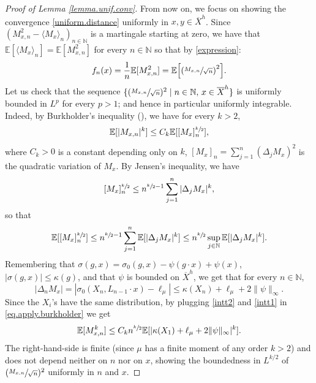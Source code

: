\documentclass[JEP,XML,SOM,Unicode,published]{cedram}
\let\sep\mid
\theoremstyle{plain}
\theoremstyle{definition}
\newcommand\E{\mathbb{E}}
\newcommand\N{\mathbb{N}}
\begin{document}
\begin{proof}[Proof of Lemma \ref{lemma.unif.conv}]
From now on, we focus on showing the convergence \eqref{uniform.distance} uniformly in $x,y\in \overline{X}^h$. Since $(M_{x,n}^2-\langle M_x\rangle_n)_{n\in \N}$ is a martingale starting at zero, we have that $\E[\langle M_x\rangle_n]=\E[M_{x,n}^2]$ for every $n\in \N$ so that by \eqref{expression}:
\begin{equation}\label{identity1}
f_n(x)=\frac{1}{n}\E[M_{x,n}^2]=\E\Bigl[\left(\sfrac{M_{x,n}}{\sqrt{n}}\right)^2\Bigr].
\end{equation}
Let us check that the sequence $\{(\sfrac{M_{x,n}}{\sqrt{n}})^2 \sep n\in \N,\, x\in \overline{X}^h\}$ is uniformly bounded in $L^p$ for every $p> 1$; and hence in particular uniformly integrable. Indeed,
by Burkholder's inequality (\cite[Th.\,9]{burkholder}), we have
for every $k>2$,
\begin{equation}\label{eq.apply.burkholder}
\E[|M_{x,n}|^k]\leq C_k \E[[M_x]_n^{\sfrac{k}{2}}],
\end{equation}
where $C_k>0$ is a constant depending only on $k$, $[M_x]_n=\sum_{j=1}^n{(\Delta_j M_{x})^2}$ is the quadratic variation of $M_x$.
By Jensen's inequality, we have
\[
[M_x]_n^{\sfrac{k}{2}}\leq n^{\sfrac{k}{2}-1}\sum_{j=1}^n{|\Delta_j M_{x}|^k},
\]
so that
\begin{equation}\label{intt1}
\E[[M_x]_n^{\sfrac{k}{2}}]\leq
n^{\sfrac{k}{2}-1}\sum_{j=1}^n{\E[|\Delta_j M_{x}|^k]}\leq n^{\sfrac{k}{2}}
\sup_{j\in \N}{\E[|\Delta_j M_{x}|^k}].
\end{equation}
Remembering that $\sigma(g,x)=\sigma_0(g,x)-\psi(g\cdot x)+\psi(x)$, $|\sigma(g,x)|\leq \kappa(g)$, and that $\psi$ is bounded on $\overline{X}^h$, we get that for every $n\in \N$,
\begin{equation}\label{intt2}
|\Delta_n M_{x}|=|\sigma_0(X_n, L_{n-1}\cdot x)-\ell_{\mu}|\leq \kappa(X_n) + \ell_{\mu} +2\|\psi\|_{\infty}.
\end{equation}
Since the $X_i$'s have the same distribution, by plugging \eqref{intt2} and
\eqref{intt1} in \eqref{eq.apply.burkholder} we get
\[
\E[M_{x,n}^k]\leq C_k n^{\sfrac{k}{2}}\E[|\kappa(X_1) + \ell_{\mu} +2\|\psi\|_{\infty}|^k].
\]
The right-hand-side is finite (since $\mu$ has a finite moment of any order $k>2$) and does not depend neither on $n$ nor on $x$, showing the boundedness in $L^{k/2}$ of $(\sfrac{M_{x,n}}{\sqrt{n}})^2$ uniformly in $n$ and $x$.


\end{proof}
\end{document}
